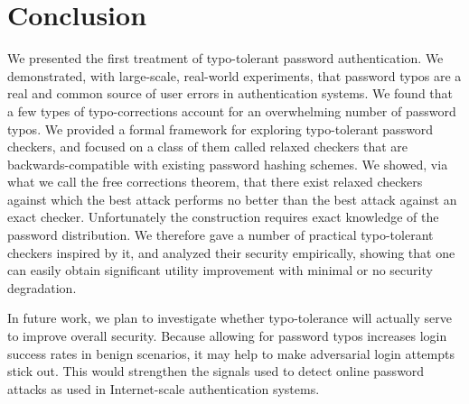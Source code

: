 \section{Conclusion}
\label{sec:conclusion}

We presented the first treatment of typo-tolerant password authentication. We
demonstrated, with large-scale, real-world experiments, that password typos are
a real and common source of user errors in authentication systems. We found that
a few types of typo-corrections account for an overwhelming number of password
typos. We provided a formal framework for exploring typo-tolerant password
checkers, and focused on a class of them called relaxed checkers that are
backwards-compatible with existing password hashing schemes. We showed, via what
we call the free corrections theorem, that there exist relaxed checkers against
which the best attack performs no better than the best attack against an exact
checker. Unfortunately the construction requires exact knowledge of the password
distribution. We therefore gave a number of practical typo-tolerant checkers
inspired by it,  and analyzed their security empirically, showing that one can
easily obtain significant utility improvement with minimal or no security
degradation.

In future work, we plan to investigate whether typo-tolerance will actually
serve to improve overall security. Because allowing for password typos
increases login success rates in benign scenarios, it may help to make
adversarial login attempts stick out.  This would strengthen the signals used to
detect online password attacks as used in Internet-scale authentication systems. 


